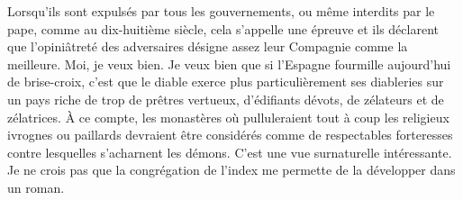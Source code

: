 \documentclass[french,twoside]{book} %
\newcommand{\astertri}{\medskip\par\centerline{\color{rubric}\large\selectfont{\syms ✻\,✻\,✻}}\medskip\par}%
\begin{document}
Lorsqu’ils sont expulsés par tous les gouvernements, ou même interdits par le pape, comme au dix-huitième siècle, cela s’appelle une épreuve et ils déclarent que l’opiniâtreté des adversaires désigne assez leur Compagnie comme la meilleure. Moi, je veux bien. Je veux bien que si l’Espagne fourmille aujourd’hui de brise-croix, c’est que le diable exerce plus particulièrement ses diableries sur un pays riche de trop de prêtres vertueux, d’édifiants dévots, de zélateurs et de zélatrices. À ce compte, les monastères où pulluleraient tout à coup les religieux ivrognes ou paillards devraient être considérés comme de respectables forteresses contre lesquelles s’acharnent les démons. C’est une vue surnaturelle intéressante. Je ne crois pas que la congrégation de l’index me permette de la développer dans un roman.\par
 \par

\astertri
\end{document}
